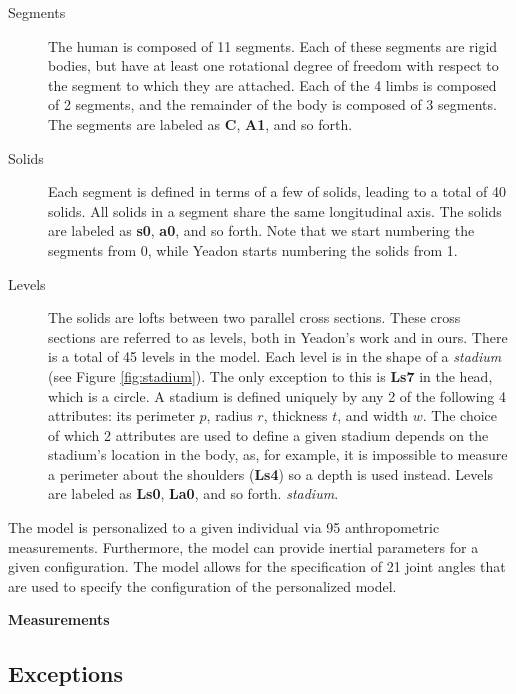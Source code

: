 \documentclass[10pt]{article}
\begin{document}
\begin{description}
    \item[Segments]
        The human is composed of 11 segments. Each of these segments are rigid
        bodies, but have at least one rotational degree of freedom with respect
        to the segment to which they are attached. Each of the 4 limbs is
        composed of 2 segments, and the remainder of the body is composed of 3
        segments. The segments are labeled as \textbf{C}, \textbf{A1}, and so
        forth.
    \item[Solids]
        Each segment is defined in terms of a few of solids, leading to a
        total of 40 solids. All solids in a
        segment share the same longitudinal axis. The solids are labeled as
        \textbf{s0}, \textbf{a0}, and so forth. Note that we start numbering
        the segments from 0, while Yeadon starts numbering the solids from 1.
    \item[Levels]
        The solids are lofts between two parallel cross sections.
        These cross sections are referred to as levels, both in
        Yeadon's work and in ours. There is a total of 45 levels in the model.
        Each level is in the shape of a \emph{stadium} (see Figure
        \ref{fig:stadium}). The only exception to this is \textbf{Ls7} in the
        head, 
        which is a circle. A stadium is defined uniquely by any 2 of the
        following 4 attributes: its perimeter $p$, radius $r$, thickness $t$,
        and width $w$.
        The choice of which 2 attributes are used to define a given stadium
        depends on the stadium's location in the body, as, for example, it is
        impossible to measure a perimeter about the shoulders (\textbf{Ls4}) so
        a depth is used instead.
        Levels are labeled as \textbf{Ls0}, \textbf{La0}, and so forth.
        \emph{stadium}.
\end{description}

The model is personalized to a given individual via 95 anthropometric
measurements.
Furthermore, the model can provide inertial parameters for a given
configuration. The model allows for the specification of 21 joint angles that
are used to specify the configuration of the personalized model.

\textbf{Measurements}


\subsection*{Exceptions}
\end{document}
